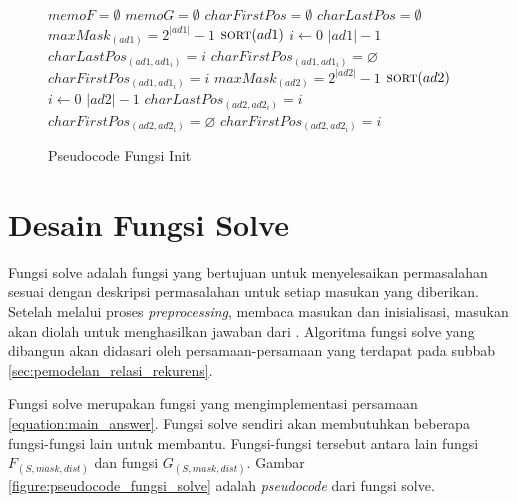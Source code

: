 \begin{figure}[H]
	\begin{mdframed}
		\begin{codebox}
			\li $memoF = \emptyset$
			\li $memoG = \emptyset$
			\li $charFirstPos = \emptyset$
			\li $charLastPos = \emptyset$
			\li $maxMask_{(ad1)} = 2^{|ad1|}-1$
			\li $\textnormal{\scshape sort}(ad1)$
			\li \For $i \gets 0$ \To $|ad1| - 1$ \Do
			\li		$charLastPos_{(ad1, ad1_{i})} = i$
			\li		\If $charFirstPos_{(ad1, ad1_{i})} = \varnothing$ \Then
			\li			$charFirstPos_{(ad1, ad1_{i})} = i$
					\End
				\End
			\li $maxMask_{(ad2)} = 2^{|ad2|}-1$
			\li $\textnormal{\scshape sort}(ad2)$
			\li \For $i \gets 0$ \To $|ad2| - 1$ \Do
			\li		$charLastPos_{(ad2, ad2_{i})} = i$
			\li		\If $charFirstPos_{(ad2, ad2_{i})} = \varnothing$ \Then
			\li			$charFirstPos_{(ad2, ad2_{i})} = i$
					\End
				\End	
		\end{codebox}
	\end{mdframed}
	\caption{Pseudocode Fungsi Init}
	\label{figure:pseudocode_fungsi_init}
\end{figure}

\section{Desain Fungsi Solve}
\label{sec:desain_fungsi_solve}

Fungsi solve adalah fungsi yang bertujuan untuk menyelesaikan permasalahan sesuai dengan deskripsi permasalahan untuk setiap masukan yang diberikan. Setelah melalui proses \textit{preprocessing}, membaca masukan dan inisialisasi, masukan akan diolah untuk menghasilkan jawaban dari \problem{}. Algoritma fungsi solve yang dibangun akan didasari oleh persamaan-persamaan yang terdapat pada subbab \ref{sec:pemodelan_relasi_rekurens}.

Fungsi solve merupakan fungsi yang mengimplementasi persamaan \ref{equation:main_answer}. Fungsi solve sendiri akan membutuhkan beberapa fungsi-fungsi lain untuk membantu. Fungsi-fungsi tersebut antara lain fungsi $ F_{(S, mask, dist)} $ dan fungsi $ G_{(S, mask, dist)} $. Gambar \ref{figure:pseudocode_fungsi_solve} adalah \textit{pseudocode} dari fungsi solve. 

